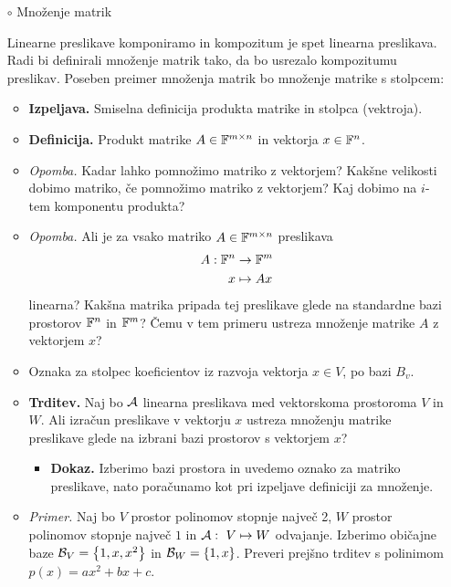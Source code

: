 \begin{enumerate}
    \item[$\circ$] Množenje matrik
    
    Linearne preslikave komponiramo in kompozitum je spet linearna preslikava. Radi bi definirali množenje matrik tako, da bo usrezalo kompozitumu preslikav. Poseben preimer množenja matrik bo množenje matrike s stolpcem:
    \begin{itemize}
        \item \colorbox{blue!30}{\textbf{Izpeljava.}} Smiselna definicija produkta matrike in stolpca (vektroja). 
        \item \colorbox{purple!30}{\textbf{Definicija.}} Produkt matrike $A \in \mathbb{F}^{m \times n}$ in vektorja $x \in \mathbb{F}^n$.
        \item \colorbox{yellow!30}{\emph{Opomba.}} Kadar lahko pomnožimo matriko z vektorjem? Kakšne velikosti dobimo matriko, če pomnožimo matriko z vektorjem? Kaj dobimo na $i$-tem komponentu produkta?
        \item \colorbox{yellow!30}{\emph{Opomba.}} Ali je za vsako matriko $A \in \mathbb{F}^{m \times n}$ preslikava \begin{align*}
            A: \mathbb{F}^n &\to \mathbb{F}^m \\
            x &\mapsto Ax 
        \end{align*}
        linearna? Kakšna matrika pripada tej preslikave glede na standardne bazi prostorov $\mathbb{F}^n$ in $\mathbb{F}^m$? Čemu v tem primeru ustreza množenje matrike $A$ z vektorjem $x$?
        \item Oznaka za stolpec koeficientov iz razvoja vektorja $x \in V$, po bazi $B_v$.
        \item \colorbox{blue!30}{\textbf{Trditev.}} Naj bo $\mathcal{A}$ linearna preslikava med vektorskoma prostoroma $V$ in $W$. Ali izračun preslikave v vektorju $x$ ustreza množenju matrike preslikave glede na izbrani bazi prostorov s vektorjem $x$?
        \begin{itemize}
            \item \colorbox{green!30}{\textbf{Dokaz.}} Izberimo bazi prostora in uvedemo oznako za matriko preslikave, nato poračunamo kot pri izpeljave definiciji za množenje.
        \end{itemize}
        \item \colorbox{yellow!30}{\emph{Primer.}} Naj bo $V$ prostor polinomov stopnje največ 2, $W$ prostor polinomov stopnje največ $1$ in $\mathcal{A}: \ V \mapsto W$ odvajanje. Izberimo običajne baze $\mathcal{B}_V = \left\{1, x, x^2\right\}$ in $\mathcal{B}_W = \left\{1, x\right\}$. Preveri prejšno trditev s polinimom $p(x) = ax^2 + bx + c$.

\end{itemize}
\end{enumerate}
